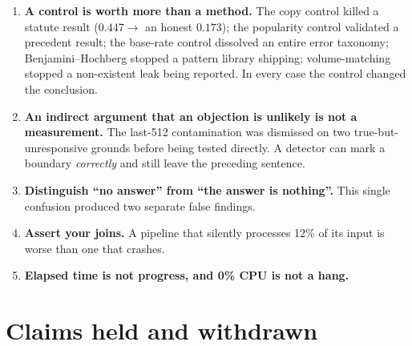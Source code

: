 \documentclass[12pt,a4paper]{article}
\begin{document}
\begin{enumerate}
\item \textbf{A control is worth more than a method.} The copy control killed a statute result
($0.447 \rightarrow$ an honest $0.173$); the popularity control validated a precedent result; the
base-rate control dissolved an entire error taxonomy; Benjamini--Hochberg stopped a pattern library
shipping; volume-matching stopped a non-existent leak being reported. In every case the control
changed the conclusion.
\item \textbf{An indirect argument that an objection is unlikely is not a measurement.} The
last-512 contamination was dismissed on two true-but-unresponsive grounds before being tested
directly. A detector can mark a boundary \emph{correctly} and still leave the preceding sentence.
\item \textbf{Distinguish ``no answer'' from ``the answer is nothing''.} This single confusion
produced two separate false findings.
\item \textbf{Assert your joins.} A pipeline that silently processes 12\% of its input is worse than
one that crashes.
\item \textbf{Elapsed time is not progress, and 0\% CPU is not a hang.}
\end{enumerate}

\section{Claims held and withdrawn}\label{sec:retracted}
\end{document}
